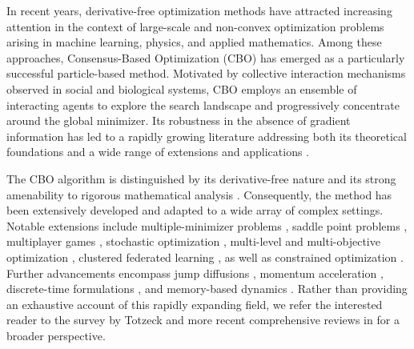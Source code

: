 \documentclass[12pt]{amsart}
\numberwithin{equation}{section}
\begin{document}
In recent years, derivative-free optimization methods have attracted increasing attention in the context of large-scale and non-convex optimization problems arising in machine learning, physics, and applied mathematics. Among these approaches, Consensus-Based Optimization (CBO) \cite{pinnau2017consensus,carrillo2018analytical} has emerged as a particularly successful particle-based method. Motivated by collective interaction mechanisms observed in social and biological systems, CBO employs an ensemble of interacting agents to explore the search landscape and progressively concentrate around the global minimizer. Its robustness in the absence of gradient information has led to a rapidly growing literature addressing both its theoretical foundations and a wide range of extensions and applications \cite{ha2022stochastic,borghi2022consensus,carrillo2022consensus,carrillo2021consensus,fornasier2022anisotropic,fornasier2020consensus,fornasier2024truncated,byeon2025consensus,wei2025consensus,bonandin2025consensus,cipriani2022zero,huang2024fast,huang2023global,roith2025consensus}.

The CBO algorithm is distinguished by its derivative-free nature and its strong amenability to rigorous mathematical analysis \cite{fornasier2024consensus,huang2025faithful}. Consequently, the method has been extensively developed and adapted to a wide array of complex settings. Notable extensions include multiple-minimizer problems \cite{bungert2025polarized}, saddle point problems \cite{huang2024consensus,borghi2024particle}, multiplayer games \cite{chenchene2025consensus}, 
stochastic optimization \cite{bellavia2025discrete}, multi-level \cite{herty2025multiscale,garcia2025defending} and multi-objective optimization \cite{borghi2023adaptive}, clustered federated learning \cite{carrillo2023fedcbo}, as well as constrained optimization \cite{bungert2025mirrorcbo,beddrich2026constrained,borghi2023constrained}. Further advancements encompass jump diffusions \cite{kalise2023consensus,aceves2026consensus}, momentum acceleration \cite{chen2022consensus}, discrete-time formulations \cite{ha2024time,ha2020convergence,ko2022convergence}, and memory-based dynamics \cite{riedl2024leveraging,huang2024self,totzeck2020consensus}. Rather than providing an exhaustive account of this rapidly expanding field, we refer the interested reader to the survey by Totzeck \cite{totzeck2021trends} and more recent comprehensive reviews in \cite{fornasier2026consensus} for a broader perspective.
\end{document}
